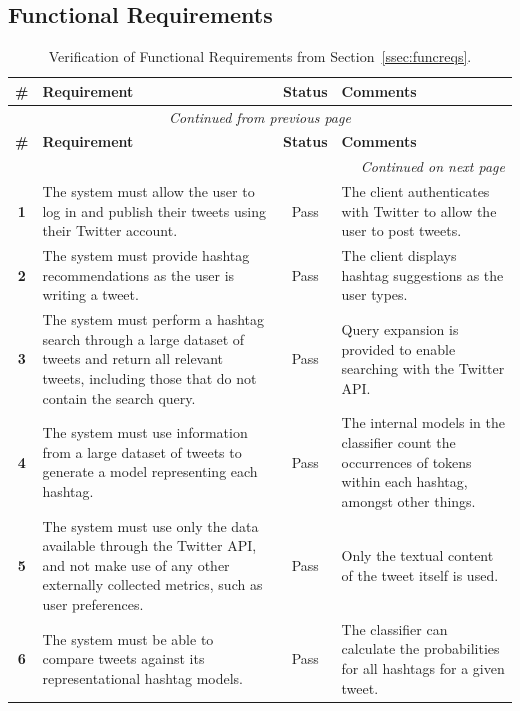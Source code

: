 \documentclass[11pt,a4paper]{report}
\begin{document}
\subsection{Functional Requirements}
\begin{center}
    \begin{longtable}{|c|p{5.5cm}||c|p{5cm}|}
        \hline
        \textbf{\#} & \textbf{Requirement} & \textbf{Status} & \textbf{Comments} \\
        \hline
        \hline
        \endfirsthead
        \multicolumn{4}{c}{\textit{Continued from previous page}} \\
        \hline
        \textbf{\#} & \textbf{Requirement} & \textbf{Status} & \textbf{Comments} \\
        \hline
        \hline
        \endhead
        \hline
        \multicolumn{4}{r}{\textit{Continued on next page}} \\
        \endfoot
        \hline
        \caption{Verification of Functional Requirements from Section~\ref{ssec:funcreqs}.}
        \endlastfoot
        \textbf{1} & The system must allow the user to log in and publish their tweets using their Twitter account. & Pass & The client authenticates with Twitter to allow the user to post tweets. \\
        \hline
        \textbf{2} & The system must provide hashtag recommendations as the user is writing a tweet. & Pass & The client displays hashtag suggestions as the user types. \\
        \hline
        \textbf{3} & The system must perform a hashtag search through a large dataset of tweets and return all relevant tweets, including those that do not contain the search query. & Pass & Query expansion is provided to enable searching with the Twitter API. \\
        \hline
        \textbf{4} & The system must use information from a large dataset of tweets to generate a model representing each hashtag. & Pass & The internal models in the classifier count the occurrences of tokens within each hashtag, amongst other things. \\
        \hline
        \textbf{5} & The system must use only the data available through the Twitter API, and not make use of any other externally collected metrics, such as user preferences. & Pass & Only the textual content of the tweet itself is used. \\
        \hline
        \textbf{6} & The system must be able to compare tweets against its representational hashtag models. & Pass & The classifier can calculate the probabilities for all hashtags for a given tweet. \\

\end{longtable}
\end{center}
\end{document}
